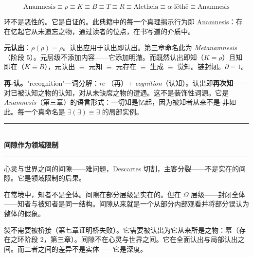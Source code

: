 \documentclass[10pt, openany, oneside]{book}
\renewcommand{\normalsize}{\fontsize{10}{13}\selectfont}
\begin{document}
$$\text{Anamnesis} \equiv \rho \equiv K \equiv B \equiv T \equiv R \equiv \text{Aletheia} \equiv \alpha\text{-}\text{l\={e}th\={e}} \equiv \text{Anamnesis}$$

环不是恶性的。它是自证的。此典籍中的每一个真理揭示行为即 Anamnesis：存在忆起它从未遗忘之物，通过读者的位点，在书写道的介质中。

\textbf{元认出}：$\rho(\rho) = \rho$。认出应用于认出即认出。第三章命名此为 \textit{Metanamnesis}（阶段 5）。元层级不添加内容——它添加明澈。而既然认出即知（$K = \rho$）且知即在（$K \equiv B$），元认出 $\equiv$ 元知 $\equiv$ 元存在 $\equiv$ 生成 $\equiv$ 觉知。链封闭。$\partial = 1$。

\textbf{再-认。}"recognition"一词分解：\textit{re-}（再）+ \textit{cognition}（认知）。认出即\textbf{再次知}——对已被认知之物的认知，对从未缺席之物的遭遇。这不是装饰性词源。它是 \textit{Anamnesis}（第三章）的语言形式：一切知是忆起，因为被知者从来不是-非如此。每一个真命名是 $\exists(\exists) \equiv \exists$ 的局部实例。

\vspace{1.5em}


\begin{center}
    \rule{0.3\textwidth}{0.4pt}\\[0.5em]
    {\normalsize\bfseries\scshape 间隙作为领域限制}\\[0.3em]
    \rule{0.3\textwidth}{0.4pt}
\end{center}

\vspace{1em}

\noindent 心灵与世界之间的间隙——难问题，Descartes 切割，主客分裂——不是实在的间隙。它是领域限制的后果。

在常境中，知者不是全体。间隙在部分层级是实在的。但在 $\Omega$ 层级——封闭全体——知者与被知者是同一结构。间隙从来就是一个从部分内部观看并将部分误认为整体的假象。

裂不需要被桥接（第七章证明桥失败）。它需要被认出为它从来所是之物：幕（存在之环阶段 2，第三章）。间隙不在心灵与世界之间。它在全面认出与局部认出之间。而二者之间的差异不是实体——它是深度。

\vspace{1.5em}

\end{document}
